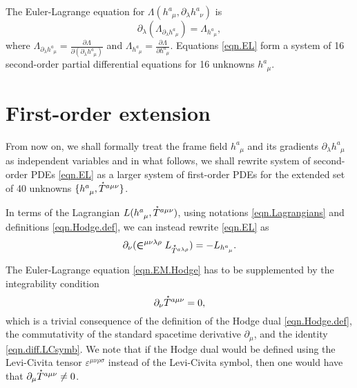 \documentclass[
10pt, %
a4paper, %
oneside, %
headinclude,footinclude, %
BCOR5mm, %
]{scrartcl}
\newcommand{\IP}[1]{{\color{Red}[IP:\ \ #1]}}
\newcommand{\pd}[1]{\partial_{#1}}
\newcommand{\tetrsymbol}{h}
\newcommand{\tetr}[2]{\tetrsymbol^{#1}_{\phantom{#1}#2}}
\newcommand{\D}[1]{\partial_{#1}} %
\newcommand{\Lag}{\Lambda}	%
\newcommand{\Laghodge}{L}%
\newcommand{\LCsymb}{\bm{\in}}    %
\newcommand{\LCtens}{\varepsilon} %
\newcommand{\HDT}[1]{\accentset{\star}{T}^{#1}}
\begin{document}
The Euler-Lagrange equation for $ \Lag(\tetr{a}{\mu},\pd{\lambda}\tetr{a}{\nu}) $ is
\begin{equation}\label{eqn.EL}
\pd{\lambda}(\Lag_{\pd{\lambda}\tetr{a}{\mu}}) = \Lag_{\tetr{a}{\mu}},
\end{equation}
where $ \Lag_{\pd{\lambda}\tetr{a}{\mu}} = \frac{\partial 
\Lag}{\partial(\pd{\lambda}\tetr{a}{\mu})} $ and $ 
\Lag_{\tetr{a}{\mu}} = \frac{\partial \Lag}{\partial\tetr{a}{\mu}} $. Equations \eqref{eqn.EL} 
form a system of 16 second-order partial differential equations for 16 unknowns $ \tetr{a}{\mu} $.


\section{First-order extension}\label{sec.PDEs}

From now on, we shall formally treat the frame field $ \tetr{a}{\mu} $ and its gradients $ 
\pd{\lambda}\tetr{a}{\mu} $ as independent variables and in what follows, we shall rewrite system 
of second-order PDEs \eqref{eqn.EL} as a larger system of first-order PDEs for the extended set of 
40 unknowns $ \{ \tetr{a}{\mu},\HDT{a\mu\nu}\} $.


In terms of the Lagrangian $ \Laghodge(\tetr{a}{\mu},\HDT{a\mu\nu}) $, using notations 
\eqref{eqn.Lagrangians} and definitions 
\eqref{eqn.Hodge.def}, we can instead
rewrite \eqref{eqn.EL} as
\begin{equation}\label{eqn.EM.Hodge}
\D{\nu}(\LCsymb^{\mu\nu\lambda\rho}\Laghodge_{\HDT{a\lambda\rho}}) 
=-\Laghodge_{\tetr{a}{\mu}}.
\end{equation}

The Euler-Lagrange equation \eqref{eqn.EM.Hodge} has to be supplemented by the integrability 
condition
\begin{equation}\label{integr.HT}
\D{\nu}\HDT{a\mu\nu} = 0,
\end{equation}
which is a trivial consequence of the definition of the  Hodge dual \eqref{eqn.Hodge.def}, the 
commutativity of the standard spacetime derivative $ \D{\mu} $, and the 
identity \eqref{eqn.diff.LCsymb}.
We note that if the Hodge dual would be defined using the Levi-Civita tensor $ 
\LCtens^{\mu\nu\rho\sigma} $ instead of the Levi-Civita symbol, then one would 
have that $ \D{\mu}\HDT{a\mu\nu} \neq 0 $.
\end{document}
